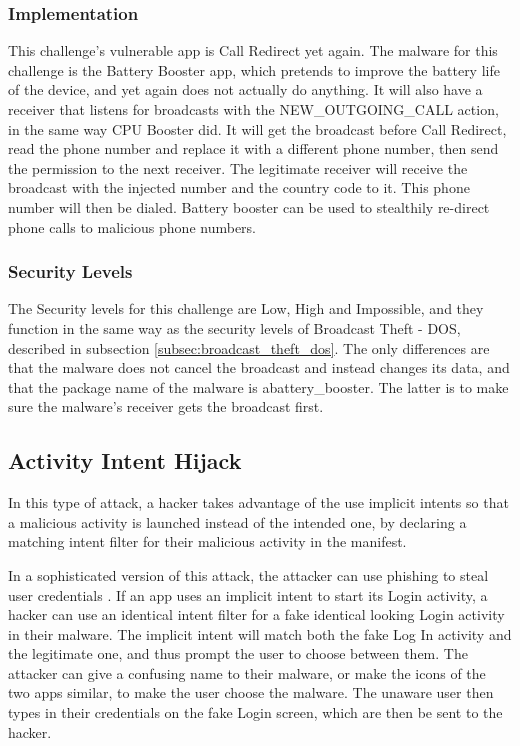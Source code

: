     \subsubsection{Implementation}
        \label{subsubsec:broadcast_theft_mitm_implementation}

    This challenge's vulnerable app is Call Redirect yet again. The malware for this challenge is the Battery Booster app, which pretends to improve the battery life of the device, and yet again does not actually do anything. It will also have a receiver that listens for broadcasts with the NEW\_OUTGOING\_CALL action, in the same way CPU Booster did. It will get the broadcast before Call Redirect, read the phone number and replace it with a different phone number, then send the permission to the next receiver. The legitimate receiver will receive the broadcast with the injected number and the country code to it. This phone number will then be dialed. Battery booster can be used to stealthily re-direct phone calls to malicious phone numbers.
    
    \subsubsection{Security Levels}
        \label{subsubsec:broadcast_theft_mitm_security_levels}
        
    The Security levels for this challenge are Low, High and Impossible, and they function in the same way as the security levels of Broadcast Theft - DOS, described in subsection \ref{subsec:broadcast_theft_dos}. The only differences are that the malware does not cancel the broadcast and instead changes its data, and that the package name of the malware is abattery\_booster. The latter is to make sure the malware's receiver gets the broadcast first.
    
    \subsection{Activity Intent Hijack}
        \label{subsec:activity_hijacking}
        
    In this type of attack, a hacker takes advantage of the use implicit intents so that a malicious activity is launched instead of the intended one, by declaring a matching intent filter for their malicious activity in the manifest.
    
    In a sophisticated version of this attack, the attacker can use phishing to steal user credentials \cite{2010_icc_paper}. If an app uses an implicit intent to start its Login activity, a hacker can use an identical intent filter for a fake identical looking Login activity in their malware. The implicit intent will match both the fake Log In activity and the legitimate one, and thus prompt the user to choose between them. The attacker can give a confusing name to their malware, or make the icons of the two apps similar, to make the user choose the malware. The unaware user then types in their credentials on the fake Login screen, which are then be sent to the hacker.
    
